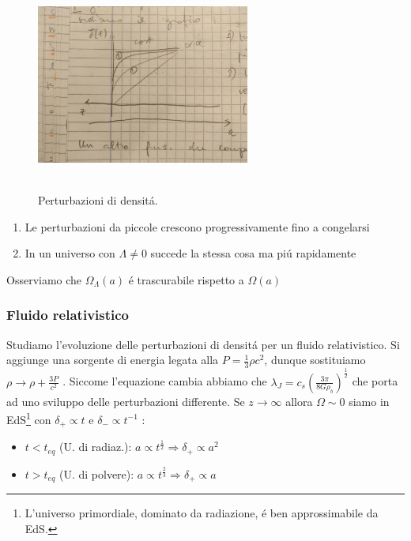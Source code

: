 \documentclass[12pt, a4paper]{article}
\begin{document}
\begin{figure}[htp]
    \centering
    \includegraphics[width=7cm, height=7cm]{images/pertgen.jpeg}
    \caption{Perturbazioni di densit\'{a}.}
    \label{fig:pertgen}
\end{figure}
\begin{enumerate}
\item Le perturbazioni da piccole crescono progressivamente fino a congelarsi
\item In un universo con $\Lambda\neq0$ succede la stessa cosa ma pi\'{u} rapidamente
\end{enumerate}
Osserviamo che  $\Omega_{\Lambda }(a)$ \'{e} trascurabile rispetto a $\Omega(a)$ 
\subsubsection{Fluido relativistico}
Studiamo l'evoluzione delle perturbazioni di densit\'{a} per un fluido relativistico. Si aggiunge una sorgente di energia legata alla $P=\frac{1}{3}\rho c^2$, dunque sostituiamo $\rho \rightarrow \rho +\frac{3P}{c^2}$ . Siccome l'equazione cambia abbiamo che $\lambda_J=c_s (\frac{3\pi}{8G\rho_b})^{\frac{1}{2}}$ che porta ad uno sviluppo delle perturbazioni differente.
Se $z\rightarrow \infty$ allora $\Omega \sim 0$ siamo in EdS\footnote{L'universo primordiale, dominato da radiazione, \'{e} ben approssimabile da EdS.} con $\delta_+\propto t$ e $\delta_- \propto t^{-1}$ :
\begin{itemize}
\item $t<t_{eq}$ (U. di radiaz.): $a\propto t^{\frac{1}{2}}\Rightarrow \delta_+\propto a^2$ 
\item $t>t_{eq}$ (U. di polvere): $a\propto t^{\frac{2}{3}}\Rightarrow \delta_+\propto a$ 
\end{itemize}
\end{document}
